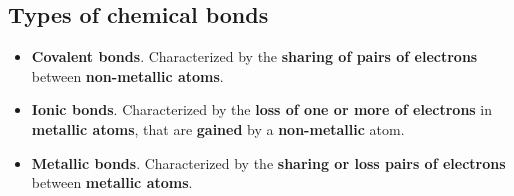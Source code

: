 \documentclass{article}
\begin{document}
		\subsection*{Types of chemical bonds}

			\begin{itemize}
				\item \textbf{Covalent bonds}. Characterized by the \textbf{sharing of pairs of electrons} between \textbf{non-metallic atoms}.
				\item \textbf{Ionic bonds}. Characterized by the \textbf{loss of one or more of electrons} in \textbf{metallic atoms}, that are \textbf{gained} by a \textbf{non-metallic} atom.
				\item \textbf{Metallic bonds}. Characterized by the \textbf{sharing or loss pairs of electrons} between \textbf{metallic atoms}.
			\end{itemize}
						
			\begin{center}
			\end{center}

			
\end{document}
